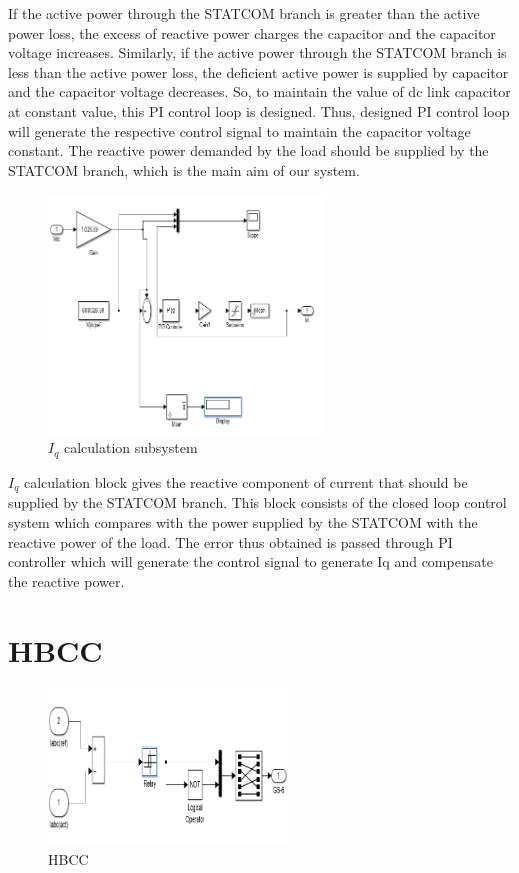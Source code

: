 \documentclass[journal,twoside]{IEEEtran}
\begin{document}
If the active power through the
STATCOM branch is greater than the active
power loss, the excess of reactive power charges
the capacitor and the capacitor voltage
increases. Similarly, if the active power through
the STATCOM branch is less than the active
power loss, the deficient active power is supplied
by capacitor and the capacitor voltage
decreases. So, to maintain the value of dc link capacitor at constant value, this PI control loop
is designed. Thus, designed PI control loop will
generate the respective control signal to
maintain the capacitor voltage constant.
The reactive power demanded by the load
should be supplied by the STATCOM branch,
which is the main aim of our system.

\begin{figure}[!ht]
\includegraphics[width=2.9in]{5}
\caption{$I_q$ calculation subsystem}
\label{f5}
\end{figure}
 $I_q$ calculation block gives the reactive component
of current that should be supplied by the
STATCOM branch. This block consists of the
closed loop control system which compares with
the power supplied by the STATCOM with the
reactive power of the load. The error thus
obtained is passed through PI controller which
will generate the control signal to generate Iq
and compensate the reactive power.

\section{HBCC}

\begin{figure}[!ht]
\includegraphics[width=2.5in]{6}
\caption{HBCC}
\label{f6}
\end{figure}
\end{document}
